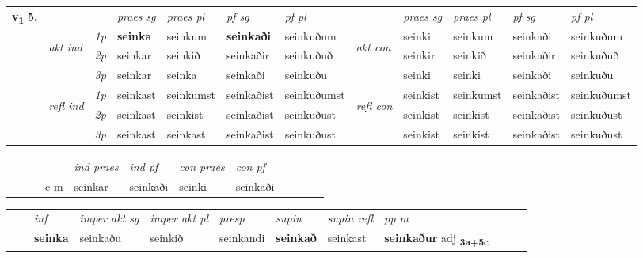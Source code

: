 \begin{tabular}{llllllllllll} \toprule
\multirow{4}{*}{{{\textbf{v{\textsubscript{1}}} \Large{\textbf{5.}}}}}  & &   &  \textit{praes sg}  & \textit{praes pl}  &\textit{ pf sg} & \textit{pf pl} &  &  \textit{praes sg}  & \textit{praes pl}  & \textit{pf sg} & \textit{pf pl } \\*
	\cmidrule{4-7} \cmidrule{9-12}
 & \multirow{3}{*}{\begin{turn}{90}\textit{akt ind}\end{turn}} & {\textit{1p}} & \textbf{seinka} & seinkum    & \textbf{seinkaði} & seinkuðum & \multirow{3}{*}{\begin{turn}{90}\textit{akt con}\end{turn}} &seinki & seinkum & seinkaði & seinkuðum\\*
& &  {\textit{2p}} &  seinkar  & seinkið   & seinkaðir & seinkuðuð & & seinkir & seinkið & seinkaðir & seinkuðuð \\*
& &  {\textit{3p}} & seinkar & seinka   & seinkaði & seinkuðu & & seinki & seinki& seinkaði & seinkuðu  \\*
\cmidrule{4-7} \cmidrule{9-12}
 &\multirow{3}{*}{\begin{turn}{90}\textit{refl ind}\end{turn}} & {\textit{1p}} & seinkast & seinkumst    & seinkaðist & seinkuðumst & \multirow{3}{*}{\begin{turn}{90}\textit{refl con}\end{turn}}  &seinkist & seinkumst & seinkaðist & seinkuðumst\\*
 &&  {\textit{2p}} &  seinkast  & seinkist   & seinkaðist & seinkuðust & &seinkist & seinkist & seinkaðist & seinkuðust \\*
& &  {\textit{3p}} & seinkast & seinkast   & seinkaðist & seinkuðust & & seinkist & seinkist& seinkaðist & seinkuðust  \\*
\cmidrule{4-7} \cmidrule{9-12}
\end{tabular}


\begin{tabular}{llllllllllll}
 & &  & &  \textit{ind praes} & \textit{ind pf} & \textit{con praes} & \textit{con pf} \\*
&  & & e-m & seinkar & seinkaði & seinki & seinkaði \\*
\cmidrule{5-9}
\end{tabular}


\begin{tabular}{llllllllllll}
 & & \textit{inf} & \textit{imper akt sg} & \textit{imper akt pl}   & \textit{presp} & \textit{supin} & \textit{supin refl} & \textit{pp m}     \\*
  & & \textbf{seinka} & seinkaðu  & seinkið   & seinkandi &  \textbf{seinkað} & seinkast & \textbf{seinkaður} adj \textbf{\textsubscript{3a+5c}} \\*
\cmidrule{1-12}
\end{tabular}



